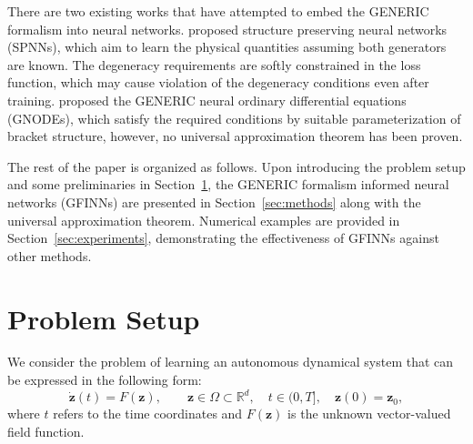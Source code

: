 \documentclass[openacc]{rsproca_new}%
\newcommand{\z}{\bm{z}}
\begin{document}
There are two existing works that have attempted to
embed the GENERIC formalism into neural networks.
\cite{hernandez2021structure}
proposed structure preserving 
neural networks (SPNNs),
which aim to learn the physical quantities 
assuming both generators are known.
The degeneracy requirements
are softly constrained in the 
loss function,
which may cause violation 
of the degeneracy conditions 
even after training.
\cite{lee2021machine}
proposed 
the GENERIC neural ordinary differential
equations (GNODEs),
which satisfy the required conditions 
by suitable parameterization of bracket structure,
however,
no universal approximation theorem has been proven. 

The rest of the paper is organized as follows.
Upon introducing the problem setup and 
some preliminaries in Section~\ref{sec:setup},
the GENERIC formalism informed neural networks (GFINNs) are presented in Section~\ref{sec:methods}
along with 
the universal approximation theorem.
Numerical examples are provided 
in Section~\ref{sec:experiments},
demonstrating 
the effectiveness of GFINNs
against other methods.






\section{Problem Setup} \label{sec:setup}
We consider the problem of learning an autonomous dynamical system that can be expressed in the following form:
\begin{equation}
    \dot{\z}(t) = F(\z), \qquad \z \in \Omega \subset \mathbb{R}^d, 
    \quad t \in (0,T], 
    \quad \z(0) = \z_0,
\end{equation}
where $t$ refers to the time coordinates
and 
$F(\z)$ is the unknown vector-valued field function.
\end{document}
